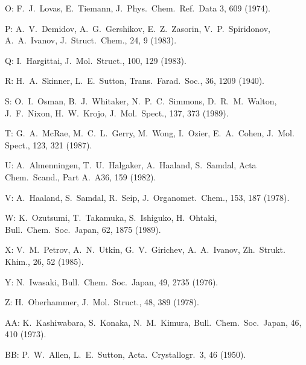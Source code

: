\begin{description}
\item{   O: } F.\ J.\ Lovas, E.\ Tiemann, J.\ Phys.\ Chem.\ Ref.\ Data 3, 609 (1974).
  
\item{   P: } A.\ V.\ Demidov, A.\ G.\ Gershikov, E.\ Z.\ Zasorin, V.\ P.\ Spiridonov,
       A.\ A.\ Ivanov, J.\ Struct.\ Chem., 24, 9 (1983).
  
\item{   Q: } I.\ Hargittai, J.\ Mol.\ Struct., 100, 129 (1983).
  
\item{   R: } H.\ A.\ Skinner, L.\ E.\ Sutton, Trans.\ Farad.\ Soc., 36, 1209 (1940).
  
\item{   S: } O.\ I.\ Osman, B.\ J.\ Whitaker, N.\ P.\ C.\ Simmons, D.\ R.\ M.\ Walton,
      J.\ F.\ Nixon, H.\ W.\ Krojo, J.\ Mol.\ Spect., 137, 373 (1989).
  
\item{   T: } G.\ A.\ McRae, M.\ C.\ L.\ Gerry, M.\ Wong, I.\ Ozier, E.\ A.\ Cohen, J.\ Mol.
       Spect., 123, 321 (1987).
  
\item{   U: } A.\ Almenningen, T.\ U.\ Halgaker, A.\ Haaland, S.\ Samdal,
       Acta Chem.\ Scand., Part A.\ A36, 159 (1982).
  
\item{   V: } A.\ Haaland, S.\ Samdal, R.\ Seip, J.\ Organomet.\ Chem., 153, 187 (1978).
  
\item{   W: } K.\ Ozutsumi, T.\ Takamuka, S.\ Ishiguko, H.\ Ohtaki, Bull.\ Chem.\ Soc.\ Japan,
       62, 1875 (1989).
  
\item{   X: } V.\ M.\ Petrov, A.\ N.\ Utkin, G.\ V.\ Girichev, A.\ A.\ Ivanov, Zh.\ Strukt.
       Khim., 26, 52 (1985).
  
\item{   Y: } N.\ Iwasaki, Bull.\ Chem.\ Soc.\ Japan, 49, 2735 (1976).
  
\item{   Z: } H.\ Oberhammer, J.\ Mol.\ Struct., 48, 389 (1978).
  
\item{  AA: } K.\ Kashiwabara, S.\ Konaka, N.\ M.\ Kimura, Bull.\ Chem.\ Soc.\ Japan,
       46, 410 (1973).
  
\item{  BB: } P.\ W.\ Allen, L.\ E.\ Sutton, Acta.\ Crystallogr.\ 3, 46 (1950).
  

\end{description}
